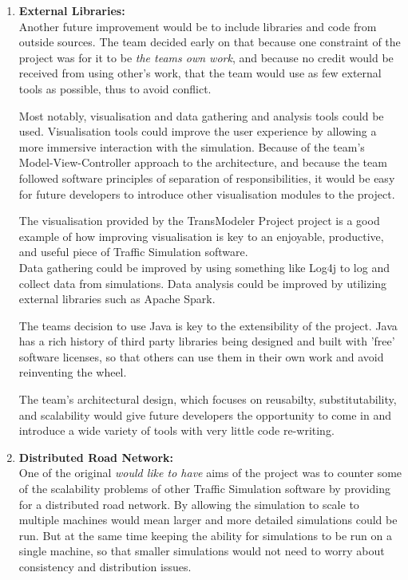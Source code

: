 \documentclass[11pt]{article}
\begin{document}
\begin{enumerate}
\begin{enumerate}
	\item \textbf{External Libraries:}
	\\
	
	Another future improvement would be to include libraries and code from outside sources. The team decided early on that because one constraint of the project was for it to be \textit{the teams own work}, and because no credit would be received from using other's work, that the team would use as few external tools as possible, thus to avoid conflict. 
	
	Most notably, visualisation and data gathering and analysis tools could be used. Visualisation tools could improve the user experience by allowing a more immersive interaction with the simulation. Because of the team's Model-View-Controller approach to the architecture, and because the team followed software principles of separation of responsibilities, it would be easy for future developers to introduce other visualisation modules to the project.
	
	The visualisation provided by the TransModeler Project project \cite{website:caliper.com-transmodeler} is a good example of how improving visualisation is key to an enjoyable, productive, and useful piece of Traffic Simulation software.
	\\ Data gathering could be improved by using something like Log4j \cite{website:Apache-Log4j} to log and collect data from simulations. Data analysis could be improved by utilizing external libraries such as Apache Spark.
	
	The teams decision to use Java is key to the extensibility of the project. Java has a rich history of third party libraries being designed and built with 'free' software licenses, so that others can use them in their own work and avoid reinventing the wheel.
	
	The team's architectural design, which focuses on reusabilty, substitutability, and scalability would give future developers the opportunity to come in and introduce a wide variety of tools with very little code re-writing.\\
	
	\item \textbf{Distributed Road Network:}
	\\
	
	One of the original \textit{would like to have} aims of the project was to counter some of the scalability problems of other Traffic Simulation software \cite{SewWilMer10} by providing for a distributed road network. By allowing the simulation to scale to multiple machines would mean larger and more detailed simulations could be run. But at the same time keeping the ability for simulations to be run on a single machine, so that smaller simulations would not need to worry about consistency and distribution issues.
	

\end{enumerate}
\end{enumerate}
\end{document}
